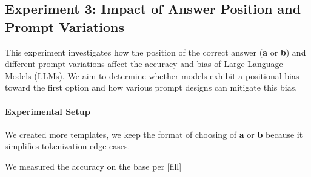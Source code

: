 \subsection{Experiment 3: Impact of Answer Position and Prompt Variations}

This experiment investigates how the position of the correct answer (\textbf{a} or \textbf{b}) and different prompt variations affect the accuracy and bias of Large Language Models (LLMs). We aim to determine whether models exhibit a positional bias toward the first option and how various prompt designs can mitigate this bias.

\paragraph{Experimental Setup}
We created more templates, we keep the format of choosing of \textbf{a} or \textbf{b} because it simplifies tokenization edge cases.

We measured the accuracy on the base per [fill]

